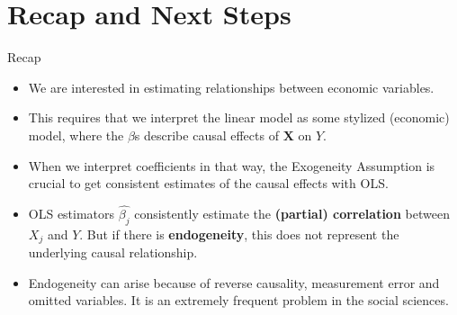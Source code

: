 \documentclass[11pt, aspectratio = 169]{beamer}
\begin{document}
\section{Recap and Next Steps}

\begin{frame}{Recap}
\begin{itemize}
    \item We are interested in estimating \alert relationships between economic variables.

\item This requires that we interpret the linear model as some stylized (economic) model, where the $\beta$s describe causal effects of $\boldsymbol{X}$ on $Y$.

\item When we interpret coefficients in that way, the \alert{Exogeneity Assumption} is crucial to get consistent estimates of the causal effects with OLS.

\item  OLS estimators $\hat{\beta_j}$ consistently estimate the \textbf{(partial) correlation} between $X_j$ and $Y$. But if there is \textbf{endogeneity}, this  does not represent the underlying causal relationship.

\item Endogeneity can arise because of reverse causality, measurement error and omitted variables. It is an extremely frequent problem in the social sciences.
\end{itemize}
\end{frame}
\end{document}
